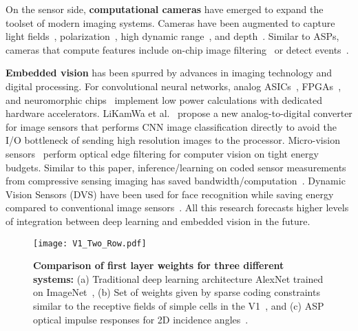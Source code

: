 \documentclass[10pt,twocolumn,letterpaper]{article}
\begin{document}
On the sensor side, \textbf{computational cameras} have emerged to expand the toolset of modern imaging systems. Cameras have been augmented to capture light fields~\cite{hirsch2014switchable, ng2005light,veeraraghavan2007dappled}, polarization~\cite{gruev2010ccd}, high dynamic range~\cite{serrano2016convolutional}, and depth~\cite{Payne2014}. Similar to ASPs, cameras that compute features include on-chip image filtering~\cite{gruev2002implementation, nilchi2009focal} or detect events~\cite{lichtsteiner2008128}.  

\textbf{Embedded vision} has been spurred by advances in imaging technology and digital processing. For convolutional neural networks, analog ASICs~\cite{boser1991analog}, FPGAs~\cite{farabet2009fpga}, and neuromorphic chips~\cite{pham2012neuflow} implement low power calculations with dedicated hardware accelerators. LiKamWa et al.~\cite{likamwaRedEye} propose a new analog-to-digital converter for image sensors that performs CNN image classification directly to avoid the I/O bottleneck of sending high resolution images to the processor. Micro-vision sensors~\cite{koppal2013toward} perform optical edge filtering for computer vision on tight energy budgets. Similar to this paper, inference/learning on coded sensor measurements from compressive sensing imaging has saved bandwidth/computation~\cite{iliadis2016deep, kulkarni2015reconstruction, lohit2015reconstruction}. Dynamic Vision Sensors (DVS) have been used for face recognition while saving energy compared to conventional image sensors~\cite{miyatani2016wacv}.  All this research forecasts higher levels of integration between deep learning and embedded vision in the future.
\vspace{-1mm}


\begin{figure}[t]
\begin{center}
   \texttt{[image: V1\_Two\_Row.pdf]}
\end{center}
   \caption{\textbf{Comparison of first layer weights for three different systems:} (a) Traditional deep learning architecture AlexNet trained on ImageNet~\cite{krizhevsky2012imagenet}, (b) Set of weights given by sparse coding constraints similar to the receptive fields of simple cells in the V1~\cite{olshausen1996emergence}, and (c) ASP optical impulse responses for 2D incidence angles~\cite{hirsch2014switchable}.}
\label{fig:V1}
\end{figure}
\end{document}
